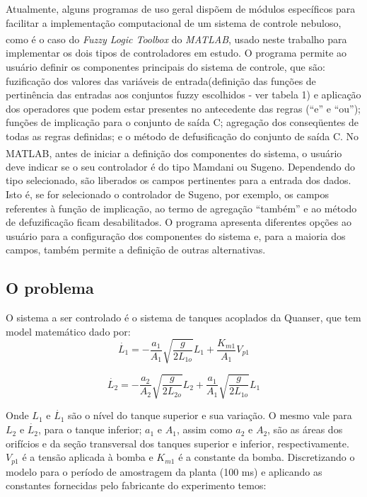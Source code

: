 \documentclass[conference]{IEEEtran}
\begin{document}
Atualmente, alguns programas de uso geral dispõem de módulos específicos para facilitar a implementação computacional de um sistema de controle nebuloso, como é o caso do \textit{Fuzzy Logic Toolbox} do \textit{MATLAB}\textsuperscript{\textregistered}, usado neste trabalho para implementar os dois tipos de controladores em estudo. O programa permite ao usuário definir os componentes principais do sistema de controle, que são: fuzificação dos valores das variáveis de entrada(definição das funções de pertinência das entradas aos conjuntos fuzzy escolhidos - ver tabela 1) e aplicação dos operadores que podem estar presentes no antecedente das regras (“e” e “ou”); funções de implicação para o conjunto de saída C; agregação dos conseqüentes de todas as regras definidas; e o método de defusificação do conjunto de saída C. No MATLAB\textsuperscript{\textregistered}, antes de iniciar a definição dos componentes do sistema, o usuário deve indicar se o seu controlador é do tipo Mamdani ou Sugeno. Dependendo do tipo selecionado, são liberados os campos pertinentes para a entrada dos dados. Isto é, se for selecionado o controlador de Sugeno, por exemplo, os campos referentes à função de implicação, ao termo de agregação “também” e ao método de defuzificação ficam desabilitados. O programa apresenta diferentes opções ao usuário para a configuração dos componentes do sistema e, para a maioria dos campos, também permite a definição de outras alternativas.

\subsection{O problema}

O sistema a ser controlado é o sistema de tanques acoplados da Quanser, que tem model matemático dado por:
\begin{equation}
\label{eq:dL1}
\dot{L_{1}} = - \frac{a_{1}}{A_{1}} \sqrt{\frac{g}{2L_{1o}}}L_{1}+\frac{K_{m1}}{A_{1}}V_{p1}
\end{equation}

\begin{equation}
\label{eq:dL2}
\dot{L_{2}} = - \frac{a_{2}}{A_{2}} \sqrt{\frac{g}{2L_{2o}}}L_{2}+\frac{a_{1}}{A_{1}} \sqrt{\frac{g}{2L_{1o}}}L_{1}
\end{equation}

Onde $L_{1}$ e $\dot{L_{1}}$ são o nível do tanque superior e sua variação. O mesmo vale para $L_{2}$ e $\dot{L_{2}}$, para o tanque inferior; $a_{1}$ e $A_{1}$, assim como $a_{2}$ e $A_{2}$, são as áreas dos orifícios e da seção transversal dos tanques superior e inferior, respectivamente. $V_{p1}$ é a tensão aplicada à bomba e $K_{m1}$ é a constante da bomba. Discretizando o modelo para o período de amostragem da planta (100 ms) e aplicando as constantes fornecidas pelo fabricante do experimento temos:
\end{document}
